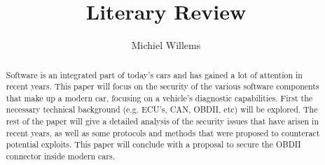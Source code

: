 \documentclass[11pt]{article}
\title{Literary Review}
\author{Michiel Willems}
\begin{document}
	

	
\maketitle

\begin{abstract}
Software is an integrated part of today’s cars and has gained a lot of attention in recent years. This paper will focus on the security of the various software components that make up a modern car, focusing on a vehicle's diagnostic capabilities. First the necessary technical background (e.g. ECU's, CAN, OBDII, etc) will be explored. The rest of the paper will give a detailed analysis of the security issues that have arisen in recent years, as well as some protocols and methods that were proposed to counteract potential exploits. This paper will conclude with a proposal to secure the OBDII connector inside modern cars.
\end{abstract}



	
\end{document}
